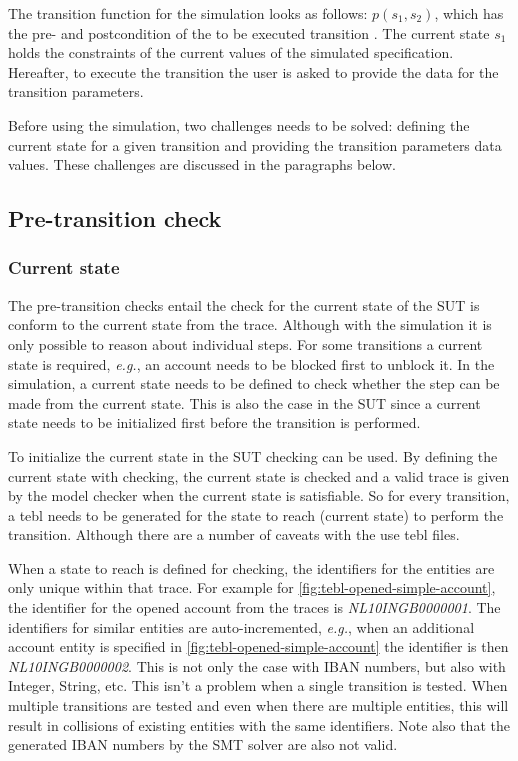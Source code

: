 The transition function for the simulation looks as follows: $p(s_{1}, s_{2})$,
which has the pre- and postcondition of the to be executed transition
\cite[p.6]{stoel_storm_vinju_bosman_2016}. The current state $s_{1}$ holds the
constraints of the current values of the simulated specification. Hereafter, to
execute the transition the user is asked to provide the data for the transition
parameters.

Before using the simulation, two challenges needs to be solved: defining the
current state for a given transition and providing the transition parameters
data values. These challenges are discussed in the paragraphs below.

\subsection{Pre-transition check}

\subsubsection*{Current state}
\label{sec:ch5-current-state}

The pre-transition checks entail the check for the current state of the SUT is
conform to the current state from the trace. Although with the simulation it is
only possible to reason about individual steps. For some transitions a current
state is required, \textit{e.g.}, an account needs to be blocked first to
unblock it. In the simulation, a current state needs to be defined to check
whether the step can be made from the current state. This is also the case in
the SUT since a current state needs to be initialized first before the
transition is performed.

To initialize the current state in the SUT checking can be used. By defining
the current state with checking, the current state is checked and a valid trace
is given by the model checker when the current state is satisfiable. So for
every transition, a tebl needs to be generated for the state to reach
(current state) to perform the transition. Although there are a number of
caveats with the use tebl files.

When a state to reach is defined for checking, the identifiers for the entities
are only unique within that trace. For example for
\autoref{fig:tebl-opened-simple-account}, the identifier for the opened account
from the traces is \textit{NL10INGB0000001}. The identifiers for similar
entities are auto-incremented, \textit{e.g.}, when an additional account entity
is specified in \autoref{fig:tebl-opened-simple-account} the identifier is then
\textit{NL10INGB0000002}. This is not only the case with IBAN numbers, but also
with Integer, String, etc. This isn't a problem when a single transition is
tested. When multiple transitions are tested and even when there are multiple
entities, this will result in collisions of existing entities with the same
identifiers. Note also that the generated IBAN numbers by the SMT solver are
also not valid.

